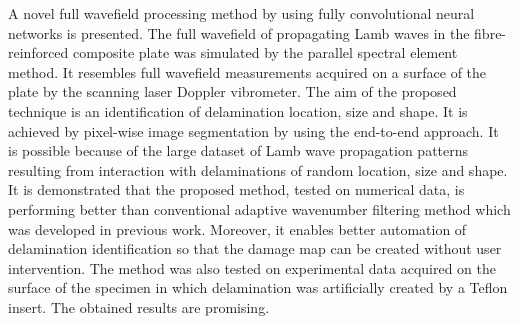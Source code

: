 A novel full wavefield processing method by using fully convolutional neural networks is presented.
The full wavefield of propagating Lamb waves in the fibre-reinforced composite plate was simulated by the parallel spectral element method.
It resembles full wavefield measurements acquired on a surface of the plate by the scanning laser Doppler vibrometer.
The aim of the proposed technique is an identification of delamination location, size and shape.
It is achieved by pixel-wise image segmentation by using the end-to-end approach.
It is possible because of the large dataset of Lamb wave propagation patterns resulting from interaction with delaminations of random location, size and shape.
It is demonstrated that the proposed method, tested on numerical data, is performing better than conventional adaptive wavenumber filtering method which was developed in previous work.
Moreover, it enables better automation of delamination identification so that the damage map can be created without user intervention.
The method was also tested on experimental data acquired on the surface of the specimen in which delamination was artificially created by a Teflon insert.
The obtained results are promising.